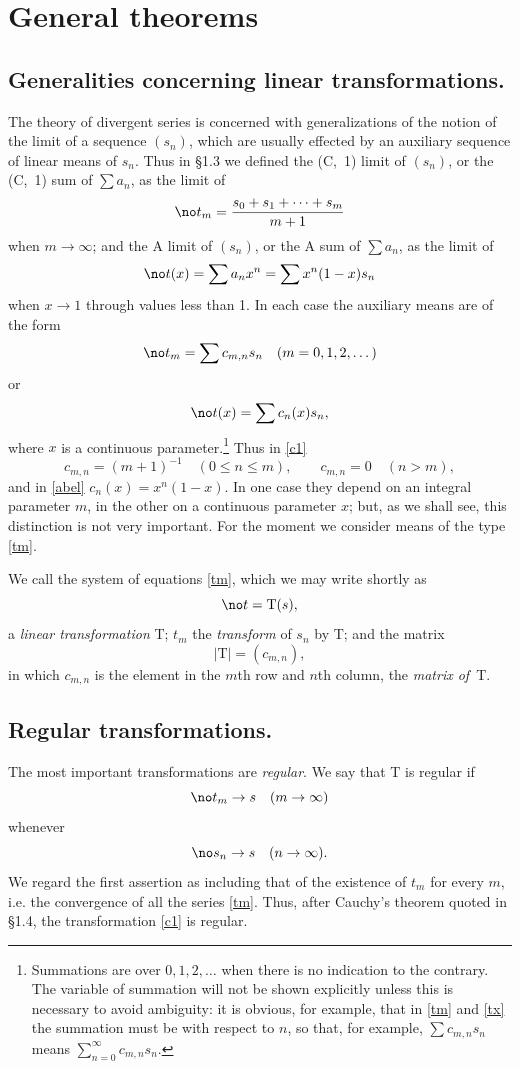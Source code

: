 
\chapter[III]{General theorems}

\section{Generalities concerning linear transformations.} The theory of
divergent series is concerned with generalizations of the notion of the
limit of a sequence $(s_n)$, which are usually effected by an auxiliary
sequence of linear means of $s_n$. Thus in \S1.3 we defined the (C,~1)
limit of $(s_n)$, or the (C,~1) sum of $\sum a_n$, as the limit of
$$\no\label{c1} t_m = \frac{s_0+s_1+\dots+s_m}{m+1}$$
when $m\to\infty$; and the A limit of $(s_n)$, or the A sum of $\sum a_n$,
as the limit of
$$\no\label{abel} t(x) = \sum a_nx^n = \sum x^n(1-x)s_n$$
when $x\to1$ through values less than 1. In each case the auxiliary means
are of the form
$$\no\label{tm} t_m = \sum c_{m,n}s_n \quad (m=0,1,2,\dots)$$
or
$$\no\label{tx} t(x) = \sum c_n(x)s_n,$$
where $x$ is a continuous parameter.\footnote{Summations are over
$0,1,2,\dots$ when there is no indication to the contrary. The variable of
summation will not be shown explicitly unless this is necessary to avoid
ambiguity: it is obvious, for example, that in \eqref{tm} and \eqref{tx}
the summation must be with respect to $n$, so that, for example,
$\sum c_{m,n}s_n$ means $\sum_{n=0}^\infty c_{m,n}s_n$.} Thus in \eqref{c1}
$$c_{m,n} = (m+1)^{-1} \quad (0\le n\le m), \qquad c_{m,n} = 0 \quad (n>m),$$
and in \eqref{abel} $c_n(x)=x^n(1-x)$. In one case they depend on an
integral parameter $m$, in the other on a continuous parameter $x$; but, as
we shall see, this distinction is not very important. For the moment we
consider means of the type \eqref{tm}.

We call the system of equations \eqref{tm}, which we may write shortly as
$$\no t = \mathrm{T}(s),$$
a \emph{linear transformation} T; $t_m$ the \emph{transform} of $s_n$ by T;
and the matrix
$$|\mathrm{T}| = (c_{m,n}),$$
in which $c_{m,n}$ is the element in the $m$th row and $n$th column, the
\emph{matrix of}~T.

\section{Regular transformations.} The most important transformations are
\emph{regular}. We say that T is regular if
$$\no t_m\to s \quad (m\to\infty)$$
whenever
$$\no s_n\to s \quad (n\to\infty).$$
We regard the first assertion as including that of the existence of $t_m$
for every $m$, i.e. the convergence of all the series \eqref{tm}. Thus,
after Cauchy's theorem quoted in \S1.4, the transformation \eqref{c1} is
regular.

